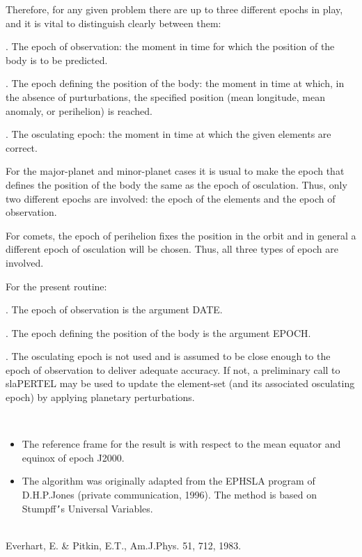 \documentclass[twoside,11pt]{article}
\renewcommand{\_}{\texttt{\symbol{95}}}
\newcommand{\sstdiytopic}[2]{\item[{\hspace{-0.35em}#1\hspace{-0.35em}:}]
\mbox{} \\[1.3ex] #2}
\newcommand{\sstitemlist}[1]{
  \mbox{} \\
  \vspace{-3.5ex}
  \begin{itemize}
     #1
  \end{itemize}
}
\newcommand{\sstitem}{\item}
\newcommand{\sstdiytopic}[2]{\item[{#1}] #2 }
\newcommand{\sstitemlist}[1]{
      \begin{itemize}
         #1
      \end{itemize}
      \\
   }
\newcommand{\sstitem}{\item}
\begin{document}
{{{      }
        Therefore, for any given problem there are up to three different
        epochs in play, and it is vital to distinguish clearly between
        them:

        . The epoch of observation:  the moment in time for which the
          position of the body is to be predicted.

        . The epoch defining the position of the body:  the moment in time
          at which, in the absence of purturbations, the specified
          position (mean longitude, mean anomaly, or perihelion) is
          reached.

        . The osculating epoch:  the moment in time at which the given
          elements are correct.

        For the major-planet and minor-planet cases it is usual to make
        the epoch that defines the position of the body the same as the
        epoch of osculation.  Thus, only two different epochs are
        involved:  the epoch of the elements and the epoch of observation.

        For comets, the epoch of perihelion fixes the position in the
        orbit and in general a different epoch of osculation will be
        chosen.  Thus, all three types of epoch are involved.

        For the present routine:

        . The epoch of observation is the argument DATE.

        . The epoch defining the position of the body is the argument
          EPOCH.

        . The osculating epoch is not used and is assumed to be close
          enough to the epoch of observation to deliver adequate accuracy.
          If not, a preliminary call to sla\_PERTEL may be used to update
          the element-set (and its associated osculating epoch) by
          applying planetary perturbations.
      \sstitemlist{

         \sstitem
         The reference frame for the result is with respect to the mean
           equator and equinox of epoch J2000.

         \sstitem
         The algorithm was originally adapted from the EPHSLA program of
           D.H.P.Jones (private communication, 1996).  The method is based
           on Stumpff{\tt '}s Universal Variables.
      }
   }
   \sstdiytopic{
      See Also
   }{
      Everhart, E. \& Pitkin, E.T., Am.J.Phys. 51, 712, 1983.
   }
}
\end{document}
